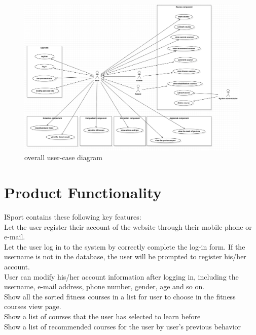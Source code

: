 \documentclass[16pt]{scrreprt}
\begin{document}
\begin{figure}[H]
    \centering
    \includegraphics[width=1.0\textwidth]{figures/big-user-case.png}
    \caption{overall user-case diagram}
\end{figure}



\section{Product Functionality}

ISport contains these following key features:\\
Let the user register their account of the website through their mobile phone or e-mail.\\

 
Let the user log in to the system by correctly complete the log-in form. If the username is not in the database, the user will be prompted to register his/her account.\\

 
User can modify his/her account information after logging in, including the username, e-mail address, phone number, gender, age and so on.\\

 
Show all the sorted fitness courses in a list for user to choose in the fitness courses view page. \\

 
Show a list of courses that the user has selected to learn before\\

 
Show a list of recommended courses for the user by user's previous behavior \\
\end{document}
